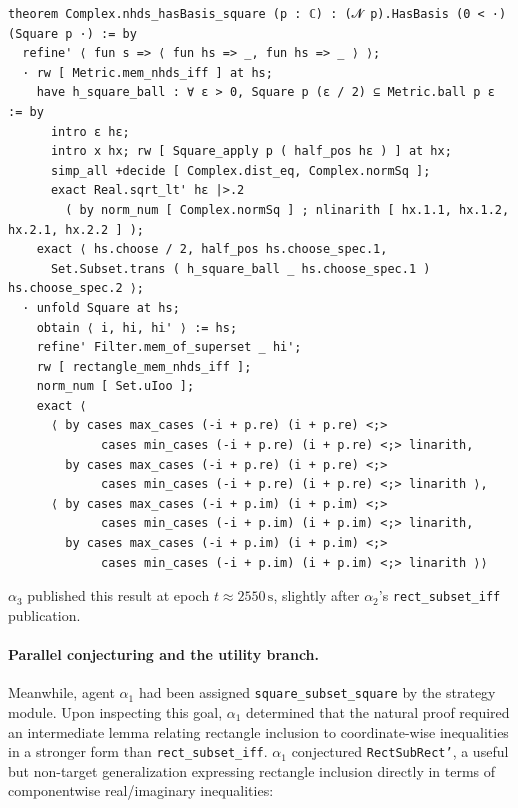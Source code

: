 \begin{lstlisting}[caption={\texttt{Complex.nhds\_hasBasis\_square}, resolved by $\alpha_3$ (lines 787--801). Longest and most technically demanding proof in the chain.},label={lst:nhdsbasis}]
theorem Complex.nhds_hasBasis_square (p : ℂ) : (𝓝 p).HasBasis (0 < ·) (Square p ·) := by
  refine' ⟨ fun s => ⟨ fun hs => _, fun hs => _ ⟩ ⟩;
  · rw [ Metric.mem_nhds_iff ] at hs;
    have h_square_ball : ∀ ε > 0, Square p (ε / 2) ⊆ Metric.ball p ε := by
      intro ε hε;
      intro x hx; rw [ Square_apply p ( half_pos hε ) ] at hx;
      simp_all +decide [ Complex.dist_eq, Complex.normSq ];
      exact Real.sqrt_lt' hε |>.2
        ( by norm_num [ Complex.normSq ] ; nlinarith [ hx.1.1, hx.1.2, hx.2.1, hx.2.2 ] );
    exact ⟨ hs.choose / 2, half_pos hs.choose_spec.1,
      Set.Subset.trans ( h_square_ball _ hs.choose_spec.1 ) hs.choose_spec.2 ⟩;
  · unfold Square at hs;
    obtain ⟨ i, hi, hi' ⟩ := hs;
    refine' Filter.mem_of_superset _ hi';
    rw [ rectangle_mem_nhds_iff ];
    norm_num [ Set.uIoo ];
    exact ⟨
      ⟨ by cases max_cases (-i + p.re) (i + p.re) <;>
             cases min_cases (-i + p.re) (i + p.re) <;> linarith,
        by cases max_cases (-i + p.re) (i + p.re) <;>
             cases min_cases (-i + p.re) (i + p.re) <;> linarith ⟩,
      ⟨ by cases max_cases (-i + p.im) (i + p.im) <;>
             cases min_cases (-i + p.im) (i + p.im) <;> linarith,
        by cases max_cases (-i + p.im) (i + p.im) <;>
             cases min_cases (-i + p.im) (i + p.im) <;> linarith ⟩⟩
\end{lstlisting}
 
$\alpha_3$ published this result at epoch $t\!\approx\!2550\,\mathrm{s}$, slightly after $\alpha_2$'s \texttt{rect\_subset\_iff} publication.
 
\paragraph{Parallel conjecturing and the utility branch.}
Meanwhile, agent $\alpha_1$ had been assigned \texttt{square\_subset\_square} by the strategy module. Upon inspecting this goal, $\alpha_1$ determined that the natural proof required an intermediate lemma relating rectangle inclusion to coordinate-wise inequalities in a stronger form than \texttt{rect\_subset\_iff}. $\alpha_1$ conjectured \texttt{RectSubRect'}, a useful but non-target generalization expressing rectangle inclusion directly in terms of componentwise real/imaginary inequalities:
 
